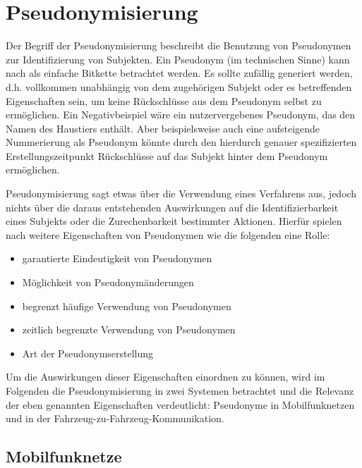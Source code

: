\section{Pseudonymisierung}

\label{sec_state_pseudonymity}

Der Begriff der Pseudonymisierung beschreibt die Benutzung von Pseudonymen zur Identifizierung von Subjekten. Ein Pseudonym (im technischen Sinne) kann nach \cite{pfitzmann2010} als einfache Bitkette betrachtet werden. Es sollte zufällig generiert werden, d.h. vollkommen unabhängig von dem zugehörigen Subjekt oder es betreffenden Eigenschaften sein, um keine Rückschlüsse aus dem Pseudonym selbst zu ermöglichen. Ein Negativbeispiel wäre ein nutzervergebenes Pseudonym, das den Namen des Haustiers enthält. Aber beispielsweise auch eine aufsteigende Nummerierung als Pseudonym könnte durch den hierdurch genauer spezifizierten Erstellungszeitpunkt Rückschlüsse auf das Subjekt hinter dem Pseudonym ermöglichen.

Pseudonymisierung sagt etwas über die Verwendung eines Verfahrens aus, jedoch nichts über die daraus entstehenden Auswirkungen auf die Identifizierbarkeit eines Subjekts oder die Zurechenbarkeit bestimmter Aktionen. Hierfür spielen nach \cite{pfitzmann2001} weitere Eigenschaften von Pseudonymen wie die folgenden eine Rolle:
\begin{itemize}
  \item garantierte Eindeutigkeit von Pseudonymen
  \item Möglichkeit von Pseudonymänderungen
  \item begrenzt häufige Verwendung von Pseudonymen 
  \item zeitlich begrenzte Verwendung von Pseudonymen
  \item Art der Pseudonymserstellung
\end{itemize}

Um die Auswirkungen dieser Eigenschaften einordnen zu können, wird im Folgenden die Pseudonymisierung in zwei Systemen betrachtet und die Relevanz der eben genannten Eigenschaften verdeutlicht: Pseudonyme in Mobilfunknetzen und in der Fahrzeug-zu-Fahrzeug-Kommunikation. 

\subsection{Mobilfunknetze}

